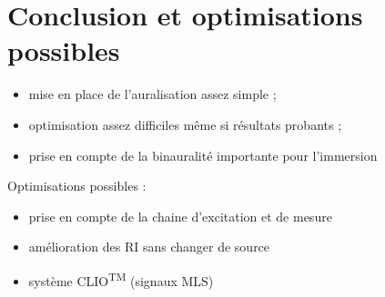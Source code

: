 \documentclass{beamer}
\begin{document}
\section{Conclusion et optimisations possibles}

\begin{frame}

\begin{itemize}
    \item mise en place de l'auralisation assez simple ;
    \item optimisation assez difficiles même si résultats probants ;
    \item prise en compte de la binauralité importante pour l'immersion
\end{itemize}

Optimisations possibles :

\begin{itemize}
    \item prise en compte de la chaine d'excitation et de mesure
    \item amélioration des RI sans changer de source
    \item système CLIO\textsuperscript{\textsc{TM}} (signaux MLS)
\end{itemize}
\end{frame}
\end{document}
